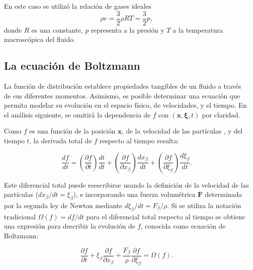 En este caso se utiliz\'o la relaci\'on de gases ideales
\begin{equation}
	\rho e = \frac{3}{2}\rho RT=\frac{3}{2}p,
\end{equation}
donde $R$ es una constante, $p$ representa a la presi\'on y $T$ a la temperatura macrosc\'opica del fluido.


\subsection{La ecuaci\'on de Boltzmann}
\label{sec:ec_boltz}
La funci\'on de distribuci\'on \fvar{} establece propiedades tangibles de un fluido a trav\'es de sus diferentes momentos. Asimismo, es posible determinar una ecuaci\'on que permita modelar su evoluci\'on en el espacio f\'isico, de velocidades, y el tiempo. En el an\'alisis siguiente, se omitir\'a la dependencia de $f$ con $(\bm{x}, \bm{\xi}, t)$ por claridad.
\par
Como $f$ es una funci\'on de la posici\'on $\bm{x}$, de la velocidad de las part\'iculas \bxi{}, y del tiempo $t$, la derivada total de $f$ respecto al tiempo resulta:

\begin{equation}
	\dfrac{df}{dt} = \left( \dfrac{\partial f}{\partial t} \right) \dfrac{dt}{dt}
	               + \left( \dfrac{\partial f}{\partial x_{\beta}} \right) \dfrac{dx_{\beta}}{dt}
	               + \left( \dfrac{\partial f}{\partial \xi_{\beta}} \right) \dfrac{d\xi_{\beta}}{dt}.
\end{equation}

Este diferencial total puede reescribirse usando la definici\'on de la velocidad de las part\'iculas ($dx_{\beta}/dt = \xi_{\beta}$), e incorporando una fuerza volum\'etrica $\bm{F}$ determinada por la segunda ley de Newton mediante $d\xi_{\beta}/dt = F_{\beta}/\rho$. Si se utiliza la notaci\'on tradicional $\Omega (f) = df/dt$ para el diferencial total respecto al tiempo se obtiene una expresi\'on para describir la evoluci\'on de $f$, conocida como ecuaci\'on de Boltzmann:

\begin{equation}
	\dfrac{\partial f}{\partial t}  +  \xi_{\beta} \dfrac{\partial f}{\partial x_{\beta}}            +  \dfrac{F_{\beta}}{\rho} \dfrac{\partial f}{\partial \xi_{\beta}} =\Omega(f).
	\label{eq:boltz}
\end{equation}

